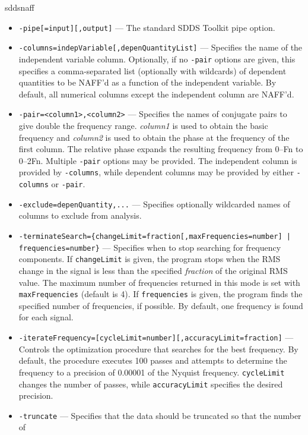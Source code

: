 \begin{sddsprog}{sddsnaff}
    \begin{itemize}
      \item \verb|-pipe[=input][,output]| --- The standard SDDS Toolkit pipe option.
      \item \verb|-columns=indepVariable[,depenQuantityList]| --- Specifies the name of the
        independent variable column. Optionally, if no \verb|-pair| options are given, this
        specifies a comma-separated list (optionally with wildcards) of dependent quantities to be
        NAFF'd as a function of the independent variable. By default, all numerical columns except
        the independent column are NAFF'd.
      \item \verb|-pair=<column1>,<column2>| --- Specifies the names of conjugate pairs to give
        double the frequency range. \emph{column1} is used to obtain the basic frequency and
        \emph{column2} is used to obtain the phase at the frequency of the first column. The
        relative phase expands the resulting frequency from 0--Fn to 0--2\*Fn. Multiple
        \verb|-pair| options may be provided. The independent column is provided by \verb|-columns|,
        while dependent columns may be provided by either \verb|-columns| or \verb|-pair|.
      \item \verb|-exclude=depenQuantity,...| --- Specifies optionally wildcarded names of columns to
        exclude from analysis.
      \item \verb!-terminateSearch={changeLimit=fraction[,maxFrequencies=number] | frequencies=number}! ---
        Specifies when to stop searching for frequency components. If \verb|changeLimit| is given,
        the program stops when the RMS change in the signal is less than the specified \emph{fraction}
        of the original RMS value. The maximum number of frequencies returned in this mode is set with
        \verb|maxFrequencies| (default is 4). If \verb|frequencies| is given, the program finds the
        specified number of frequencies, if possible. By default, one frequency is found for each
        signal.
      \item \verb|-iterateFrequency=[cycleLimit=number][,accuracyLimit=fraction]| --- Controls the
        optimization procedure that searches for the best frequency. By default, the procedure
        executes 100 passes and attempts to determine the frequency to a precision of 0.00001 of the
        Nyquist frequency. \verb|cycleLimit| changes the number of passes, while \verb|accuracyLimit|
        specifies the desired precision.
      \item \verb|-truncate| --- Specifies that the data should be truncated so that the number of

\end{itemize}
\end{sddsprog}
